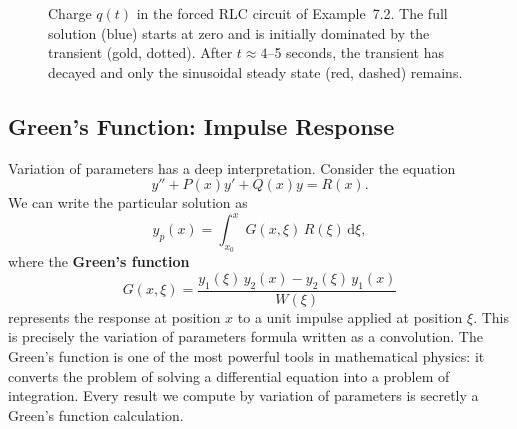 \documentclass[12pt,a4paper]{article}
\newcommand{\dd}{\mathrm{d}}
\begin{document}
\begin{figure}[H]
\centering
{}
\caption{Charge $q(t)$ in the forced RLC circuit of Example~7.2. The full
solution (blue) starts at zero and is initially dominated by the transient
(gold, dotted). After $t\approx 4$--5 seconds, the transient has decayed and
only the sinusoidal steady state (red, dashed) remains.}
\label{fig:rlc_forced}
\end{figure}

\subsection{Green's Function: Impulse Response}

Variation of parameters has a deep interpretation. Consider the equation
\[
  y'' + P(x)y' + Q(x)y = R(x).
\]
We can write the particular solution as
\[
  y_p(x) = \int_{x_0}^{x} G(x,\xi)\,R(\xi)\,\dd\xi,
\]
where the \textbf{Green's function}
\[
  G(x,\xi) = \frac{y_1(\xi)\,y_2(x) - y_2(\xi)\,y_1(x)}{W(\xi)}
\]
represents the response at position $x$ to a unit impulse applied at position
$\xi$. This is precisely the variation of parameters formula written as a
convolution. The Green's function is one of the most powerful tools in
mathematical physics: it converts the problem of solving a differential equation
into a problem of integration. Every result we compute by variation of
parameters is secretly a Green's function calculation.
\end{document}
